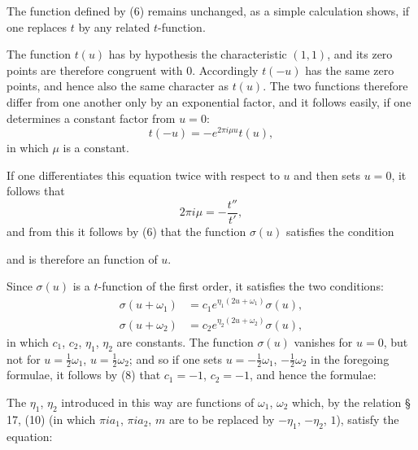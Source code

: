 
The function defined by (6) remains unchanged, as a simple calculation shows, if one replaces $t$ by any related $t$-function.

The function $t(u)$ has by hypothesis the characteristic $(1,1)$, and its zero points are therefore congruent with 0. Accordingly $t(-u)$ has the same zero points, and hence also the same character as $t(u)$. The two functions therefore differ from one another only by an exponential factor, and it follows easily, if one determines a constant factor from $u = 0$:
\[
t(-u) = -e^{2\pi i \mu u} t(u),
\]
in which $\mu$ is a constant.

If one differentiates this equation twice with respect to $u$ and then sets $u = 0$, it follows that
\[
2\pi i \mu = -\frac{t''}{t'},
\]
and from this it follows by (6) that the function $\sigma(u)$ satisfies the condition

and is therefore an  function of $u$.

Since $\sigma(u)$ is a $t$-function of the first order, it satisfies the two conditions:
\[
\begin{aligned}
\sigma(u+\omega_1) &= c_1 e^{\eta_1(2u+\omega_1)} \sigma(u),\\
\sigma(u+\omega_2) &= c_2 e^{\eta_2(2u+\omega_2)} \sigma(u),
\end{aligned}
\]
in which $c_1$, $c_2$, $\eta_1$, $\eta_2$ are constants. The function $\sigma(u)$ vanishes for $u = 0$, but not for $u = \frac{1}{2}\omega_1$, $u = \frac{1}{2}\omega_2$; and so if one sets $u = -\frac{1}{2}\omega_1$, $-\frac{1}{2}\omega_2$ in the foregoing formulae, it follows by (8) that $c_1 = -1$, $c_2 = -1$, and hence the formulae:

The $\eta_1$, $\eta_2$ introduced in this way are functions of $\omega_1$, $\omega_2$ which, by the relation \S\,17, (10) (in which $\pi i a_1$, $\pi i a_2$, $m$ are to be replaced by $-\eta_1$, $-\eta_2$, $1$), satisfy the equation:

